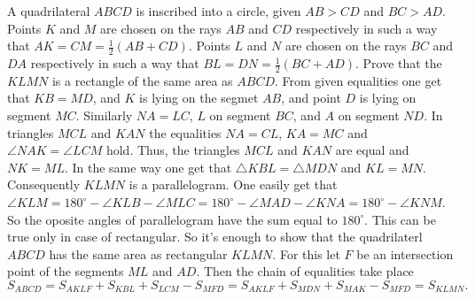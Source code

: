 \problem
A quadrilateral $ABCD$ is inscribed into a circle, given $AB > CD$ and $BC > AD$.
Points $K$ and $M$ are chosen on the rays $AB$ and $CD$ respectively in such a
way that $AK = CM = \frac{1}{2} (AB + CD)$.
Points $L$ and $N$ are chosen on the rays $BC$ and $DA$ respectively in such a
way that $BL = DN = \frac{1}{2} (BC + AD)$.
Prove that the $KLMN$ is a rectangle of the same area as $ABCD$.
\solution 
From given equalities one get that $KB=MD$, and $K$ is lying on the segmet $AB$, and point $D$ is lying on segment $MC$.
Similarly $NA = LC$, $L$ on segment $BC$, and $A$ on segment $ND$.
In triangles $MCL$ and $KAN$ the equalities $NA = CL$, $KA = MC$ and $\angle NAK = \angle LCM$ hold.
Thus, the triangles $MCL$ and $KAN$ are equal and $NK = ML$.
In the same way one get that $\triangle KBL = \triangle MDN$ and $KL = MN$.
Consequently $KLMN$ is a parallelogram.
One easily get that $\angle KLM = 180^\circ - \angle KLB - \angle MLC = 180^\circ - \angle MAD - \angle KNA = 180^\circ - \angle KNM$.
So the oposite angles of parallelogram have the sum equal to $180^\circ$.
This can be true only in case of rectangular.
So it's enough to show that the quadrilaterl $ABCD$ has the same area as rectangular $KLMN$.
For this let $F$ be an intersection point of the segments $ML$ and $AD$.
Then the chain of equalities take place 
\[
    S_{ABCD}
=
    S_{AKLF} + S_{KBL} + S_{LCM} - S_{MFD} = S_{AKLF} + S_{MDN} + S_{MAK} - S_{MFD}
=
    S_{KLMN}.
\]
\endproblem
